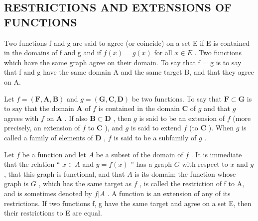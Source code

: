 \subsection{RESTRICTIONS AND EXTENSIONS OF FUNCTIONS}

Two functions f and g are said to agree (or coincide) on a set E if E is contained in the domains of f and g and if \(f(x) = g(x)\) for all \(x \in E\) . Two functions which have the same graph agree on their domain. To say that f = g is to say that f and g have the same domain A and the same target B, and that they agree on A.

Let \(f = (\mathbf{F}, \mathbf{A}, \mathbf{B})\) and \(g = (\mathbf{G}, \mathbf{C}, \mathbf{D})\) be two functions. To say that \(\mathbf{F} \subset \mathbf{G}\) is to say that the domain \(\mathbf{A}\) of \(f\) is contained in the domain \(\mathbf{C}\) of \(g\) and that \(g\) agrees with \(f\) on \(\mathbf{A}\) . If also \(\mathbf{B} \subset \mathbf{D}\) , then \(g\) is said to be an extension of \(f\) (more precisely, an extension of \(f\) to \(\mathbf{C}\) ), and \(g\) is said to extend \(f\) (to \(\mathbf{C}\) ). When \(g\) is called a family of elements of \(\mathbf{D}\) , \(f\) is said to be a subfamily of \(g\) .

Let \(f\) be a function and let \(A\) be a subset of the domain of \(f\) . It is immediate that the relation `` \(x \in A\) and \(y = f(x)\) '' has a graph \(G\) with respect to \(x\) and \(y\) , that this graph is functional, and that \(A\) is its domain; the function whose graph is \(G\) , which has the same target as \(f\) , is called the restriction of f to A, and is sometimes denoted by \(f|A\) . A function is an extension of any of its restrictions. If two functions f, g have the same target and agree on a set E, then their restrictions to E are equal.


